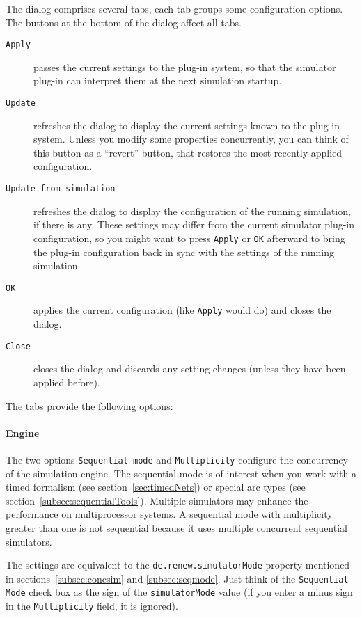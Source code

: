 The dialog comprises several tabs, each tab groups some
configuration options.
The buttons at the bottom of the dialog affect all tabs.
\begin{description}
\item[\texttt{Apply}] passes the current settings to the plug-in
  system, so that the simulator plug-in can interpret them at the
  next simulation startup. 
\item[\texttt{Update}] refreshes the dialog to display the
  current settings known to the plug-in system. 
  Unless you modify some properties concurrently, you can think
  of this button as a ``revert'' button, that restores the most
  recently applied configuration.
\item[\texttt{Update from simulation}] refreshes the dialog to
  display the configuration of the running simulation, if there
  is any.
  These settings may differ from the current simulator plug-in
  configuration, so you might want to press \texttt{Apply} or
  \texttt{OK} afterward to bring the plug-in configuration back
  in sync with the settings of the running simulation.
\item[\texttt{OK}] applies the current configuration (like
  \texttt{Apply} would do) and closes the dialog.
\item[\texttt{Close}] closes the dialog and discards any setting
  changes (unless they have been applied before).
\end{description}
The tabs provide the following options:

\paragraph{Engine}
The two options \texttt{Sequential mode} and
\texttt{Multiplicity} configure the concurrency of the simulation
engine.
The sequential mode is of interest when you work with a timed
formalism (see section~\ref{sec:timedNets}) or special arc types
(see section~\ref{subsec:sequentialTools}).
Multiple simulators may enhance the performance on multiprocessor
systems.
A sequential mode with multiplicity greater than one is not
sequential because it uses multiple concurrent sequential
simulators.

The settings are equivalent to the
\texttt{de.renew.simulatorMode} property mentioned in
sections~\ref{subsec:concsim} and \ref{subsec:seqmode}.
Just think of the \texttt{Sequential Mode} check box as the sign
of the \texttt{simulatorMode} value (if you enter a minus sign in
the \texttt{Multiplicity} field, it is ignored).

